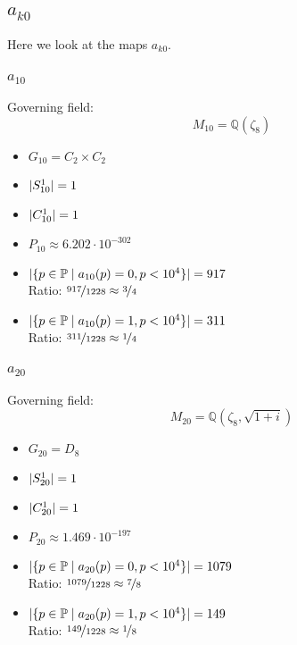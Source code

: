 \subsection{$a_{k0}$}
Here we look at the maps $a_{k0}$.

\subsubsection{$a_{10}$}
Governing field:
$$M_{10} = \mathbb{Q}\left(\zeta_8\right)$$
\begin{multicols}{2}
	\begin{itemize}
		\item $G_{10} = C_2 \times C_2$
		\item $| S_{10}^1 | = 1$
		\item $| C_{10}^1 | = 1$
		\item $P_{10} \approx 6.202 \cdot 10^{-302}$
	\end{itemize}
	\begin{itemize}
		\item $| \{ p \in \mathbb{P} \mid a_{10}(p)=0, p<10^4 \} | = 917$\\
		Ratio: $\nicefrac{ 917 }{ 1228 } \approx \nicefrac{ 3 }{ 4 }$
		\item $| \{ p \in \mathbb{P} \mid a_{10}(p)=1, p<10^4 \} | = 311$\\
		Ratio: $\nicefrac{ 311 }{ 1228 } \approx \nicefrac{ 1 }{ 4 }$
	\end{itemize}
\end{multicols}

\subsubsection{$a_{20}$}
Governing field:
$$M_{20} = \mathbb{Q}\left(\zeta_8, \sqrt{1+i}\right)$$
\begin{multicols}{2}
	\begin{itemize}
		\item $G_{20} = D_8$
		\item $| S_{20}^1 | = 1$
		\item $| C_{20}^1 | = 1$
		\item $P_{20} \approx 1.469 \cdot 10^{-197}$
	\end{itemize}
	\begin{itemize}
		\item $| \{ p \in \mathbb{P} \mid a_{20}(p)=0, p<10^4 \} | = 1079$\\
		Ratio: $\nicefrac{ 1079 }{ 1228 } \approx \nicefrac{ 7 }{ 8 }$
		\item $| \{ p \in \mathbb{P} \mid a_{20}(p)=1, p<10^4 \} | = 149$\\
		Ratio: $\nicefrac{ 149 }{ 1228 } \approx \nicefrac{ 1 }{ 8 }$
	\end{itemize}
\end{multicols}

